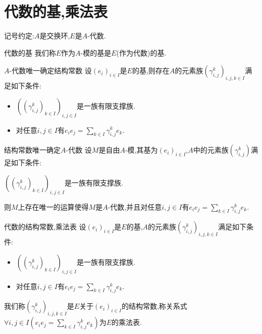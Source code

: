 \section{代数的基,乘法表}

记号约定:$A$是交换环,$E$是$A$-代数.

\begin{definition}{代数的基}{}
	我们称$E$作为$A$-模的基是$E$(作为代数)的基.
\end{definition}

\begin{proposition}{$A$-代数唯一确定结构常数}{}
	设$\left(e_{i}\right)_{i\in I}$是$E$的基,则存在$A$的元素族$\left(\gamma_{i,j}^{k}\right)_{i,j,k\in I}$满足如下条件:
	\begin{itemize}
		\item $\left(\left(\gamma_{i,j}^{k}\right)_{k\in I}\right)_{i,j\in I}$是一族有限支撑族.
		\item 对任意$i,j\in I$有$e_{i}e_{j}=\sum\limits_{k\in I}\gamma_{i,j}^{k}e_{k}$.
	\end{itemize}
\end{proposition}

\begin{proposition}{结构常数唯一确定$A$-代数}{}
	设$M$是自由$A$-模,其基为$\left(e_{i}\right)_{i\in I}$,$A$中的元素族$\left(\gamma_{i,j}^{k}\right)$满足如下条件:
	\begin{center}
		$\left(\left(\gamma_{i,j}^{k}\right)_{k\in I}\right)_{i,j\in I}$是一族有限支撑族.
	\end{center}
	则$M$上存在唯一的运算使得$M$是$A$-代数,并且对任意$i,j\in I$有$e_{i}e_{j}=\sum\limits_{k\in I}\gamma_{i,j}^{k}e_{k}$.
\end{proposition}


\begin{definition}{代数的结构常数,乘法表}{}
	设$\left(e_{i}\right)_{i\in I}$是$E$的基,$A$的元素族$\left(\gamma_{i,j}^{k}\right)_{i,j,k\in I}$满足如下条件:
	\begin{itemize}
		\item $\left(\left(\gamma_{i,j}^{k}\right)_{k\in I}\right)_{i,j\in I}$是一族有限支撑族.
		\item 对任意$i,j\in I$有$e_{i}e_{j}=\sum\limits_{k\in I}\gamma_{i,j}^{k}e_{k}$.
	\end{itemize}
	我们称$\left(\gamma_{i,j}^{k}\right)_{i,j,k\in I}$是$E$关于$\left(e_{i}\right)_{i\in I}$的结构常数,称关系式$\forall i,j\in I\left(e_{i}e_{j}=\sum\limits_{k\in I}\gamma_{i,j}^{k}e_{k}\right)$为$E$的乘法表.
\end{definition}

